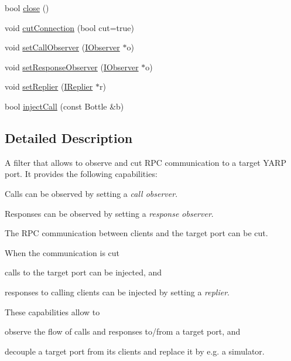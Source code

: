 \begin{DoxyCompactItemize}
\item 
bool \hyperlink{classyarp_1_1os_1_1_rpc_filter_a8bbb27455374614e29987fc7dc84aead}{close} ()
\item 
void \hyperlink{classyarp_1_1os_1_1_rpc_filter_ac6e9845cea3a4e90019d9b8608ebf531}{cutConnection} (bool cut=true)
\item 
void \hyperlink{classyarp_1_1os_1_1_rpc_filter_a53a5895db837b1e21cfa42fb26a3d653}{setCallObserver} (\hyperlink{classyarp_1_1os_1_1_i_observer}{IObserver} $\ast$o)
\item 
void \hyperlink{classyarp_1_1os_1_1_rpc_filter_a42d86d2f0a2828c57e398cced6fdadb8}{setResponseObserver} (\hyperlink{classyarp_1_1os_1_1_i_observer}{IObserver} $\ast$o)
\item 
void \hyperlink{classyarp_1_1os_1_1_rpc_filter_ad4f258b19fad32ab782e4eb608dd6c32}{setReplier} (\hyperlink{classyarp_1_1os_1_1_i_replier}{IReplier} $\ast$r)
\item 
bool \hyperlink{classyarp_1_1os_1_1_rpc_filter_a2c5878b2acec1306a960e5baf58b5521}{injectCall} (const Bottle \&b)
\end{DoxyCompactItemize}


\subsection{Detailed Description}
A filter that allows to observe and cut RPC communication to a target YARP port. It provides the following capabilities:
\begin{DoxyItemize}
\item Calls can be observed by setting a {\itshape call observer\/}.
\item Responses can be observed by setting a {\itshape response observer\/}.
\item The RPC communication between clients and the target port can be cut.
\item When the communication is cut
\begin{DoxyItemize}
\item calls to the target port can be injected, and
\item responses to calling clients can be injected by setting a {\itshape replier\/}.
\end{DoxyItemize}
\end{DoxyItemize}

These capabilities allow to
\begin{DoxyItemize}
\item observe the flow of calls and responses to/from a target port, and
\item decouple a target port from its clients and replace it by e.g. a simulator. 
\end{DoxyItemize}

